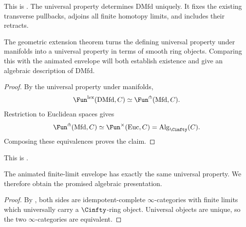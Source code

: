 This is \citet[Definition~2.1]{Carchedi_Steffens_Universal_Derived_Manifolds}.
The universal property determines $\mathrm{DMfd}$ uniquely.
It fixes the existing transverse pullbacks, adjoins all finite
homotopy limits, and includes their retracts.

The geometric extension theorem turns the defining universal property
under manifolds into a universal property in terms of smooth ring objects.
Comparing this with the animated envelope will both establish existence
and give an algebraic description of $\mathrm{DMfd}$.


\begin{proof}
  By the universal property under manifolds,
  \[
    \Fun^{\mathrm{lex}}(\mathrm{DMfd},C)
    \simeq
    \Fun^{\pitchfork}(\mathrm{Mfd},C).
  \]
  Restriction to Euclidean spaces gives
  \[
    \Fun^{\pitchfork}(\mathrm{Mfd},C)
    \simeq
    \Fun^\times(\mathrm{Euc},C)
    =
    \operatorname{Alg}_{\Cinfty}(C).
  \]
  Composing these equivalences proves the claim.
\end{proof}

This is \citet[Theorem~5.3]{Carchedi_Steffens_Universal_Derived_Manifolds}.

The animated finite-limit envelope has exactly the same universal property.
We therefore obtain the promised algebraic presentation.


\begin{proof}
  By
  ,
  both sides are idempotent-complete $\infty$-categories with finite limits
  which universally carry a $\Cinfty$-ring object. Universal objects are
  unique, so the two $\infty$-categories are equivalent.
\end{proof}

